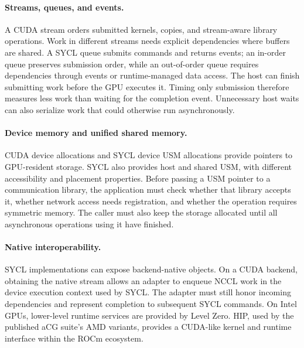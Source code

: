 \paragraph{Streams, queues, and events.}
A CUDA stream orders submitted kernels, copies, and stream-aware library operations. Work in different streams needs explicit dependencies where buffers are shared. A SYCL queue submits commands and returns events; an in-order queue preserves submission order, while an out-of-order queue requires dependencies through events or runtime-managed data access. The host can finish submitting work before the GPU executes it. Timing only submission therefore measures less work than waiting for the completion event. Unnecessary host waits can also serialize work that could otherwise run asynchronously.

\paragraph{Device memory and unified shared memory.}
CUDA device allocations and SYCL device \ac{USM} allocations provide pointers to GPU-resident storage. SYCL also provides host and shared USM, with different accessibility and placement properties. Before passing a USM pointer to a communication library, the application must check whether that library accepts it, whether network access needs registration, and whether the operation requires symmetric memory. The caller must also keep the storage allocated until all asynchronous operations using it have finished.

\paragraph{Native interoperability.}
SYCL implementations can expose backend-native objects. On a CUDA backend, obtaining the native stream allows an adapter to enqueue NCCL work in the device execution context used by SYCL. The adapter must still honor incoming dependencies and represent completion to subsequent SYCL commands. On Intel GPUs, lower-level runtime services are provided by Level Zero. HIP, used by the published aCG suite's AMD variants, provides a CUDA-like kernel and runtime interface within the ROCm ecosystem.

